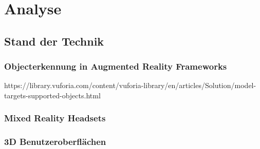 \chapter{Analyse}

\section{Stand der Technik}


\subsection{Objecterkennung in Augmented Reality Frameworks}

https://library.vuforia.com/content/vuforia-library/en/articles/Solution/model-targets-supported-objects.html



\subsection{Mixed Reality Headsets}



\subsection{3D Benutzeroberflächen}

